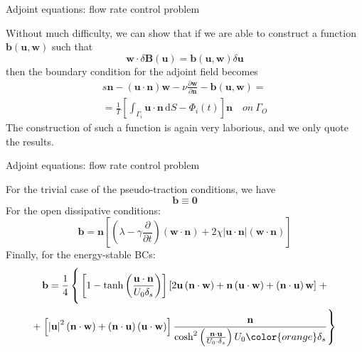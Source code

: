 \documentclass{beamer}
\begin{document}
\begin{frame}{Adjoint equations: flow rate control problem}

	Without much difficulty, we can show that if we are able to construct a function $\mathbf{b}\left(\mathbf{u},\mathbf{w}\right)$ such that
	\begin{equation}
		\mathbf{w}\cdot\delta\mathbf{B}\left(\mathbf{u}\right)=\mathbf{b}\left(\mathbf{u},\mathbf{w}\right)\delta\mathbf{u}
	\end{equation}
	then the boundary condition for the adjoint field becomes
	\begin{multline}
		s\mathbf{n}-\left(\mathbf{u}\cdot\mathbf{n}\right)\mathbf{w}-\nu\frac{\partial\mathbf{w}}{\partial\mathbf{n}}-\mathbf{b}\left(\mathbf{u},\mathbf{w}\right)=\\
		=\frac{1}{T}\left[\int_{\Gamma_{i}}\mathbf{u}\cdot\mathbf{n}\,\mathrm{d}S-\Phi_{i}\left(t\right)\right]\mathbf{n}\quad on\:\Gamma_{O}
	\end{multline}
	The construction of such a function is again very laborious, and we only quote the results.

\end{frame}

\begin{frame}{Adjoint equations: flow rate control problem}

	For the trivial case of the pseudo-traction conditions, we have
	\begin{equation}
		\mathbf{b}\equiv\mathbf{0}
	\end{equation}
	For the open dissipative conditions:
	\begin{equation}
		\mathbf{b}=\mathbf{n}\left[\left(\lambda-\gamma\frac{\partial}{\partial t}\right)\left(\mathbf{w}\cdot\mathbf{n}\right)+2\chi\left|\mathbf{u}\cdot\mathbf{n}\right|\left(\mathbf{w}\cdot\mathbf{n}\right)\right]
	\end{equation}
	Finally, for the energy-stable BCs:
	\begin{multline}
		\mathbf{b}=\frac{1}{4}\left\{ \vphantom{{\left[\left|\mathbf{u}\right|^{2}\left(\mathbf{n}\cdot\mathbf{w}\right)+\left(\mathbf{n}\cdot\mathbf{u}\right)\left(\mathbf{u}\cdot\mathbf{w}\right)\right]\frac{\mathbf{n}}{\mathrm{cosh}^{2}\left(\frac{\mathbf{n}\cdot\mathbf{u}}{U_{0}\cdot\delta_{s}}\right)U_{0}\cdot\delta_{s}}}}\left[1-\mathrm{tanh}\left(\frac{\mathbf{u}\cdot\mathbf{n}}{U_{0}\delta_{s}}\right)\right]\left[2\mathbf{u}\left(\mathbf{n}\cdot\mathbf{w}\right)+\mathbf{n}\left(\mathbf{u}\cdot\mathbf{w}\right)+\left(\mathbf{n}\cdot\mathbf{u}\right)\mathbf{w}\right]\right.+\\
		+\left.\left[\left|\mathbf{u}\right|^{2}\left(\mathbf{n}\cdot\mathbf{w}\right)+\left(\mathbf{n}\cdot\mathbf{u}\right)\left(\mathbf{u}\cdot\mathbf{w}\right)\right]\frac{\mathbf{n}}{\mathrm{cosh}^{2}\left(\frac{\mathbf{n}\cdot\mathbf{u}}{U_{0}\cdot\delta_{s}}\right)U_{0}{\color{orange}\delta_{s}}}\right\} 
	\end{multline}

\end{frame}
\end{document}
